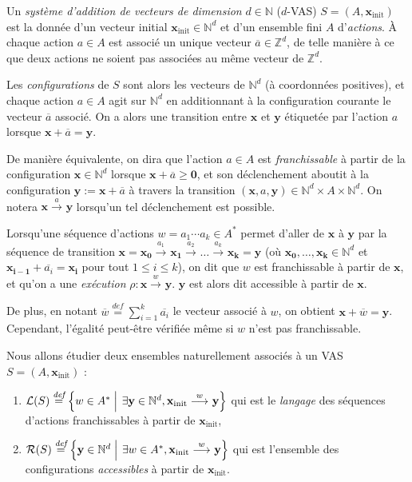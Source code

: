 \documentclass[a4paper,final]{article}
\theoremstyle{definition}
\let\leq\leqslant
\let\geq\geqslant
\newcommand{\set}[2]{\left\{#1\mathrel{\left|\vphantom{#1}\vphantom{#2}\right.}#2\right\}}
\newcommand{\defeq}{\ensuremath{\stackrel{\textit{def}}{=}}}
\newcommand{\N}{\ensuremath{\mathbb{N}}}
\newcommand{\Z}{\ensuremath{\mathbb{Z}}}
\newcommand{\lang}{\ensuremath{\mathcal{L}}}
\newcommand{\trans}[2]{\ensuremath{\stackrel{#1}{\longrightarrow}_{#2}}}
\newcommand{\vect}[1]{\ensuremath{\mathbf{#1}}}
\newcommand{\conf}[1]{\ensuremath{\mathcal{R}(#1)}}
\newcommand{\xinit}{\ensuremath{\vect{x}_\text{init}}}
\newcommand{\valeur}[1]{\ensuremath{\overline{#1}}}
\begin{document}
Un \emph{système d'addition de vecteurs de dimension} $d\in\N$ ($d$-VAS) $S=(A,\xinit)$ est la donnée d'un vecteur initial $\xinit\in\N^d$ et d'un ensemble fini $A$ d'\emph{actions}.
À chaque action $a\in A$ est associé un unique vecteur $\valeur{a}\in \Z^d$, de telle manière à ce que deux actions ne soient pas associées au même vecteur de $\Z^d$.
\vspace{3mm}

Les \emph{configurations} de $S$ sont alors les vecteurs de $\N^d$ (à coordonnées positives), 
et chaque action $a\in A$ agit sur $\N^d$ en additionnant à la configuration courante le vecteur $\valeur{a}$ associé.
On a alors une transition entre $\vect{x}$ et $\vect{y}$ étiquetée par l'action $a$ lorsque $\vect{x} + \valeur{a} = \vect{y}$.

De manière équivalente, on dira que l'action $a\in A$ est \emph{franchissable} 
à partir de la configuration $\vect{x}\in \N^d$ lorsque $\vect{x} + \valeur{a} \geq \vect{0}$,
et son déclenchement aboutit à la configuration $\vect{y} := \vect{x} + \valeur{a}$ à travers la transition $(\vect{x},a,\vect{y})\in \N^d\times A\times \N^d$.
On notera $\vect{x}\trans{a}{} \vect{y}$ lorsqu'un tel déclenchement est possible.
\vspace{3mm}

Lorsqu'une séquence d'actions $w= a_1\cdots a_k\in A^\ast$ permet d'aller de $\vect{x}$ à $\vect{y}$ par la séquence de transition $\vect{x}= \vect{x_0}\trans{a_1}{} \vect{x_1}\trans{a_2}{} \dots\trans{a_k}{} \vect{x_k}=\vect{y}$
(où $\vect{x_0},\dots,\vect{x_k} \in\N^d$ et $\vect{x_{i-1}} +\valeur{a_i} =\vect{x_i}$ pour tout $1\leq i\leq k$),
on dit que $w$ est franchissable à partir de $\vect{x}$, et qu'on a une \emph{exécution} $\rho :\vect{x}\trans{w}{} \vect{y}$.
$\vect{y}$ est alors dit accessible à partir de $\vect{x}$.

De plus, en notant $\valeur{w}\defeq \sum^k_{i=1} \valeur{a_i}$ le vecteur associé à $w$, on obtient $\vect{x} +\valeur{w} = \vect{y}$.
Cependant, l'égalité peut-être vérifiée même si $w$ n'est pas franchissable.
\vspace{3mm}

Nous allons étudier deux ensembles naturellement associés à un VAS $S=(A,\xinit)$ :
\begin{enumerate}
    \item 
    $\lang(S)\defeq \set{w\in A^\ast} {\exists \vect{y}\in\N^d, \xinit\trans{w}{}\vect{y}}$ qui est le \emph{langage} des séquences d'actions franchissables à partir de $\xinit$,
    
    \item $\conf{S}\defeq \set{\vect{y}\in\N^d} {\exists w\in A^\ast, \xinit\trans{w}{} \vect{y}}$ qui est l'ensemble des configurations \emph{accessibles} à partir de $\xinit$. 
\end{enumerate}
\end{document}
